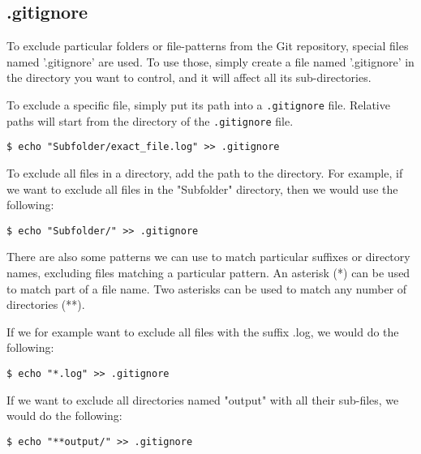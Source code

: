 \documentclass[../main/git_course_main.tex]{subfiles}
\begin{document}
\subsection{.gitignore}

To exclude particular folders or file-patterns from the Git repository, special files named '.gitignore' are used.
To use those, simply create a file named '.gitignore' in the directory you want to control, and it will affect all its sub-directories.

To exclude a specific file, simply put its path into a \verb$.gitignore$ file.
Relative paths will start from the directory of the \verb$.gitignore$ file.

\begin{codebox}
\begin{lstlisting}
$ echo "Subfolder/exact_file.log" >> .gitignore
\end{lstlisting}
\end{codebox}

To exclude all files in a directory, add the path to the directory.
For example, if we want to exclude all files in the "Subfolder" directory, then we would use the following:

\begin{codebox}
\begin{lstlisting}
$ echo "Subfolder/" >> .gitignore
\end{lstlisting}
\end{codebox}

There are also some patterns we can use to match particular suffixes or directory names, excluding files matching a particular pattern. An asterisk (*) can be used to match part of a file name. Two asterisks can be used to match any number of directories (**).

If we for example want to exclude all files with the suffix .log, we would do the following:

\begin{codebox}
\begin{lstlisting}
$ echo "*.log" >> .gitignore
\end{lstlisting}
\end{codebox}

If we want to exclude all directories named "output" with all their sub-files, we would do the following:

\begin{codebox}
\begin{lstlisting}
$ echo "**output/" >> .gitignore
\end{lstlisting}
\end{codebox}
\end{document}
